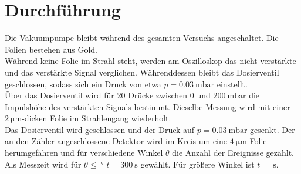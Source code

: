 \section{Durchführung}
\label{sec:Durchführung}

Die Vakuumpumpe bleibt während des gesamten Versuchs angeschaltet.
Die Folien bestehen aus Gold.\\

Während keine Folie im Strahl steht, werden am Oszilloskop das nicht verstärkte und das verstärkte Signal verglichen. Währenddessen bleibt das Dosierventil geschlossen, sodass sich ein Druck von etwa $p=\SI{0,03}{\milli\bar}$ einstellt.\\
Über das Dosierventil wird für 20 Drücke zwischen $0$ und $\SI{200}{\milli\bar}$ die Impulshöhe des verstärkten Signals bestimmt.
Dieselbe Messung wird mit einer $\SI{2}{\micro\meter}$-dicken Folie im Strahlengang wiederholt.\\
Das Dosierventil wird geschlossen und der Druck auf $p=\SI{0,03}{\milli\bar}$ gesenkt.
Der an den Zähler angeschlossene Detektor wird im Kreis um eine $\SI{4}{\micro\meter}$-Folie herumgefahren und für verschiedene Winkel $\theta$ die Anzahl der Ereignisse gezählt. Als Messzeit wird für $\theta\leq\SI{}{\degree}$ $t=\SI{300}{\second}$ gewählt. Für größere Winkel ist $t=\SI{}{\second}$.


